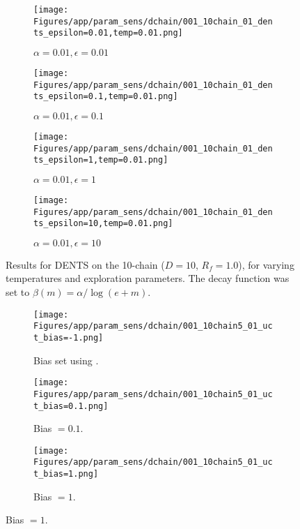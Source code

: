 \documentclass{article}
\theoremstyle{plain}
\begin{document}
\begin{appendices}
\begin{figure}
                \begin{subfigure}[b]{0.24\textwidth}
                    \centering
                    \texttt{[image: Figures/app/param\_sens/dchain/001\_10chain\_01\_dents\_epsilon=0.01,temp=0.01.png]}
                    \caption*{$\alpha=0.01,\epsilon=0.01$}
                \end{subfigure}
                \begin{subfigure}[b]{0.24\textwidth}
                    \centering
                    \texttt{[image: Figures/app/param\_sens/dchain/001\_10chain\_01\_dents\_epsilon=0.1,temp=0.01.png]}
                    \caption*{$\alpha=0.01,\epsilon=0.1$}
                \end{subfigure}
                \begin{subfigure}[b]{0.24\textwidth}
                    \centering
                    \texttt{[image: Figures/app/param\_sens/dchain/001\_10chain\_01\_dents\_epsilon=1,temp=0.01.png]}
                    \caption*{$\alpha=0.01,\epsilon=1$}
                \end{subfigure}
                \begin{subfigure}[b]{0.24\textwidth}
                    \centering
                    \texttt{[image: Figures/app/param\_sens/dchain/001\_10chain\_01\_dents\_epsilon=10,temp=0.01.png]}
                    \caption*{$\alpha=0.01,\epsilon=10$}
                \end{subfigure}
                
                \caption{Results for DENTS on the 10-chain ($D=10$, $R_f=1.0$), for varying temperatures and exploration parameters. The decay function was set to $\beta(m)=\alpha/\log(e+m)$.}
                \label{fig:dents_10chain_hps}
            \end{figure}


            \begin{figure}
                \centering
                
                \begin{subfigure}[b]{0.32\textwidth}
                    \centering
                    \texttt{[image: Figures/app/param\_sens/dchain/001\_10chain5\_01\_uct\_bias=-1.png]}
                    \caption*{Bias set using \cite{prst}.}
                \end{subfigure}
                \begin{subfigure}[b]{0.32\textwidth}
                    \centering
                    \texttt{[image: Figures/app/param\_sens/dchain/001\_10chain5\_01\_uct\_bias=0.1.png]}
                    \caption*{Bias $=0.1$.}
                \end{subfigure}
                \begin{subfigure}[b]{0.32\textwidth}
                    \centering
                    \texttt{[image: Figures/app/param\_sens/dchain/001\_10chain5\_01\_uct\_bias=1.png]}
                    \caption*{Bias $=1$.}
                \end{subfigure}
                

\end{figure}
\end{appendices}
\end{document}
